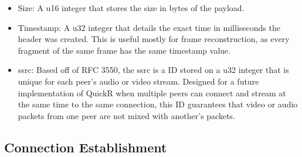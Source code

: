 \documentclass{article}
\begin{document}
\begin{itemize}
    \item Size: A u16 integer that stores the size in bytes of the payload.
    \item Timestamp: A u32 integer that details the exact time in milliseconds the header was created. This is useful mostly for frame reconstruction, as every fragment of the same frame has the same timestamp value.
    \item ssrc: Based off of RFC 3550\cite{rfc3550}, the ssrc is a ID stored on a u32 integer that is unique for each peer's audio or video stream. Designed for a future implementation of QuickR when multiple peers can connect and stream at the same time to the same connection, this ID guarantees that video or audio packets from one peer are not mixed with another's packets. 
\end{itemize}   

\subsection{Connection Establishment}
\label{sec:connection}
\end{document}
